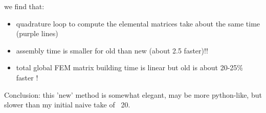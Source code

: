 we find that:
\begin{itemize}
\item quadrature loop to compute the elemental matrices take about the same time (purple lines) 
\item assembly time is smaller for old than new (about 2.5 faster)!!
\item total global FEM matrix building time is linear but old is about 20-25\% faster !
\end{itemize}

Conclusion: this 'new' method is somewhat elegant, may be more python-like, 
but slower than my initial naive take of \stone~20. 



